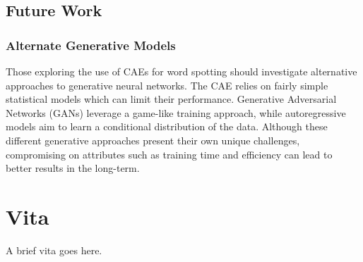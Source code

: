 \documentclass[final]{ukthesis}
\begin{document}
\section{Future Work}
\subsection{Alternate Generative Models} 
Those exploring the use of CAEs for word spotting should investigate alternative approaches to generative neural networks. The CAE relies on fairly simple statistical models which can limit their performance. Generative Adversarial Networks (GANs) \cite{goodfellow2014generative} leverage a game-like training approach, while autoregressive models \cite{oord2016pixel} aim to learn a conditional distribution of the data. Although these different generative approaches present their own unique challenges, compromising on attributes such as training time and efficiency can lead to better results in the long-term.



\copyrightnotice
\backmatter

\chapter{Vita}
A brief vita goes here.
\end{document}
